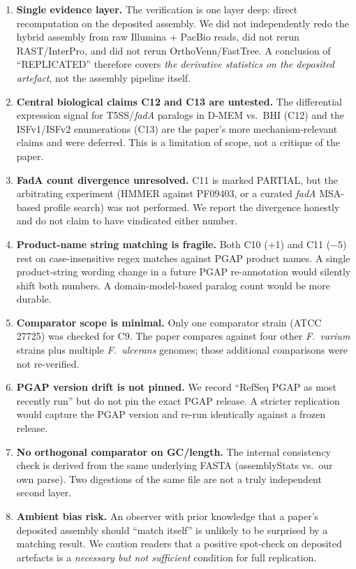 \documentclass[11pt]{article}
\begin{document}
\begin{enumerate}
  \item \textbf{Single evidence layer.} The verification is one layer deep: direct
        recomputation on the deposited assembly. We did not independently redo the hybrid
        assembly from raw Illumina + PacBio reads, did not rerun RAST/InterPro, and did
        not rerun OrthoVenn/FastTree. A conclusion of ``REPLICATED'' therefore covers
        \emph{the derivative statistics on the deposited artefact}, not the assembly
        pipeline itself.
  \item \textbf{Central biological claims C12 and C13 are untested.} The differential
        expression signal for T5SS/\emph{fadA} paralogs in D-MEM vs.\ BHI (C12) and the
        ISFv1/ISFv2 enumerations (C13) are the paper's more mechanism-relevant claims and
        were deferred. This is a limitation of scope, not a critique of the paper.
  \item \textbf{FadA count divergence unresolved.} C11 is marked PARTIAL, but the
        arbitrating experiment (HMMER against PF09403, or a curated \emph{fadA} MSA-based
        profile search) was not performed. We report the divergence honestly and do not
        claim to have vindicated either number.
  \item \textbf{Product-name string matching is fragile.} Both C10 (+1) and C11 ($-5$)
        rest on case-insensitive regex matches against PGAP product names. A single
        product-string wording change in a future PGAP re-annotation would silently
        shift both numbers. A domain-model-based paralog count would be more durable.
  \item \textbf{Comparator scope is minimal.} Only one comparator strain (ATCC 27725) was
        checked for C9. The paper compares against four other \emph{F.~varium} strains
        plus multiple \emph{F.~ulcerans} genomes; those additional comparisons were not
        re-verified.
  \item \textbf{PGAP version drift is not pinned.} We record ``RefSeq PGAP as most
        recently run'' but do not pin the exact PGAP release. A stricter replication would
        capture the PGAP version and re-run identically against a frozen release.
  \item \textbf{No orthogonal comparator on GC/length.} The internal consistency check is
        derived from the same underlying FASTA (assemblyStats vs.\ our own parse). Two
        digestions of the same file are not a truly independent second layer.
  \item \textbf{Ambient bias risk.} An observer with prior knowledge that a paper's
        deposited assembly should ``match itself'' is unlikely to be surprised by a
        matching result. We caution readers that a positive spot-check on deposited
        artefacts is a \emph{necessary but not sufficient} condition for full replication.
\end{enumerate}
\end{document}
